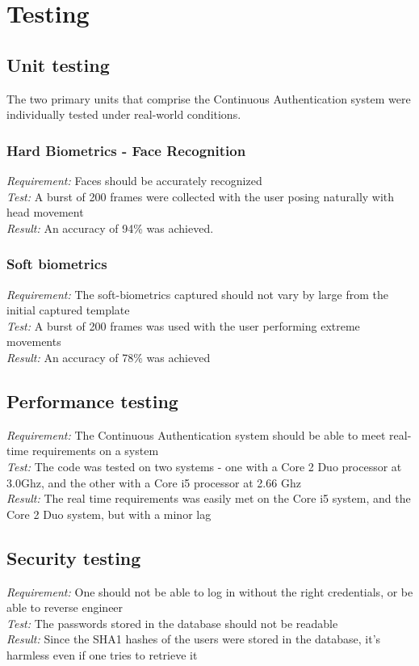 \documentclass[12pt]{article}			%
\begin{document}
\newpage
\section{ Testing }

\subsection{ Unit testing }
The two primary units that comprise the Continuous Authentication system were individually tested under real-world conditions.

\subsubsection{ Hard Biometrics - Face Recognition }
\emph{ Requirement: } Faces should be accurately recognized\\
\emph{ Test: } A burst of 200 frames were collected with the user posing naturally with head movement\\
\emph{ Result: } An accuracy of 94\% was achieved.\\

\subsubsection{ Soft biometrics }
\emph{ Requirement: } The soft-biometrics captured should not vary by large from the initial captured template\\
\emph{ Test: } A burst of 200 frames was used with the user performing extreme movements\\
\emph{ Result: } An accuracy of 78\% was achieved\\

\subsection{ Performance testing } 
\emph{ Requirement: } The Continuous Authentication system should be able to meet real-time requirements on a system\\
\emph{ Test: } The code was tested on two systems - one with a Core 2 Duo processor at 3.0Ghz, and the other with a Core i5 processor at 2.66 Ghz\\
\emph{ Result: } The real time requirements was easily met on the Core i5 system, and the Core 2 Duo system, but with a minor lag\\

\subsection{ Security testing}
\emph{ Requirement: } One should not be able to log in without the right credentials, or be able to reverse engineer\\
\emph{ Test: } The passwords stored in the database should not be readable\\
\emph{ Result: } Since the SHA1 hashes of the users were stored in the database, it's harmless even if one tries to retrieve it\\
\end{document}

